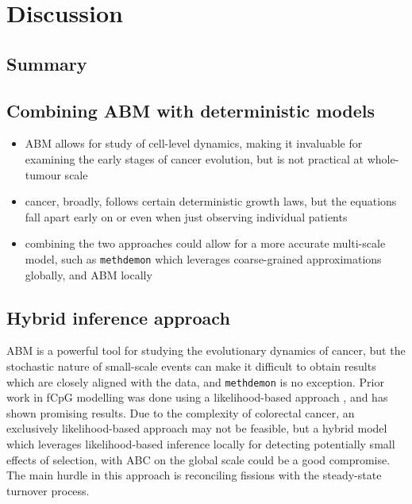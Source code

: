 \chapter{Discussion}\label{chapter:discussion}

\section{Summary}

\section{Combining ABM with deterministic models}
\begin{itemize}
    \item ABM allows for study of cell-level dynamics, making it invaluable for
    examining the early stages of cancer evolution, but is not practical at
    whole-tumour scale
    \item cancer, broadly, follows certain deterministic growth laws, but the
    equations fall apart early on or even when just observing individual
    patients
    \item combining the two approaches could allow for a more accurate
    multi-scale model, such as \texttt{methdemon} which leverages coarse-grained
    approximations globally, and ABM locally
\end{itemize}

\section{Hybrid inference approach}
ABM is a powerful tool for studying the evolutionary dynamics of cancer, but the
stochastic nature of small-scale events can make it difficult to obtain results
which are closely aligned with the data, and \texttt{methdemon} is no exception.
Prior work in fCpG modelling was done using a likelihood-based approach
\cite{gabbutt_fluctuating_2022, gabbutt_evolutionary_2023}, and has shown
promising results. Due to the complexity of colorectal cancer, an exclusively
likelihood-based approach may not be feasible, but a hybrid model which
leverages likelihood-based inference locally for detecting potentially small
effects of selection, with ABC on the global scale could be a good compromise.
The main hurdle in this approach is reconciling fissions with the steady-state
turnover process.

